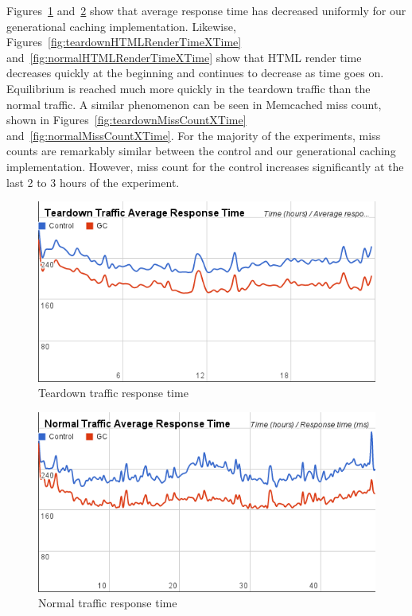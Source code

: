 \documentclass[12pt]{ucthesis}
\begin{document}
Figures~\ref{fig:teardownRespTimeXTime} and~\ref{fig:normalRespTimeXTime} show that average response time has decreased uniformly for our generational caching implementation.
Likewise, Figures~\ref{fig:teardownHTMLRenderTimeXTime} and~\ref{fig:normalHTMLRenderTimeXTime} show that HTML render time decreases quickly at the beginning and continues to decrease as time goes on.
Equilibrium is reached much more quickly in the teardown traffic than the normal traffic.
A similar phenomenon can be seen in \textsf{Memcached} miss count, shown in Figures~\ref{fig:teardownMissCountXTime} and~\ref{fig:normalMissCountXTime}.
For the majority of the experiments, miss counts are remarkably similar between the control and our generational caching implementation.
However, miss count for the control increases significantly at the last 2 to 3 hours of the experiment.

\begin{figure}[htp]
\centering
\includegraphics[width=\textwidth]{assets/teardownRespTimeXTime.png}
\caption{Teardown traffic response time}
\label{fig:teardownRespTimeXTime}
\end{figure}
\begin{figure}[htp]
\centering
\includegraphics[width=\textwidth]{assets/normalRespTimeXTime.png}
\caption{Normal traffic response time}
\label{fig:normalRespTimeXTime}
\end{figure}
\end{document}

